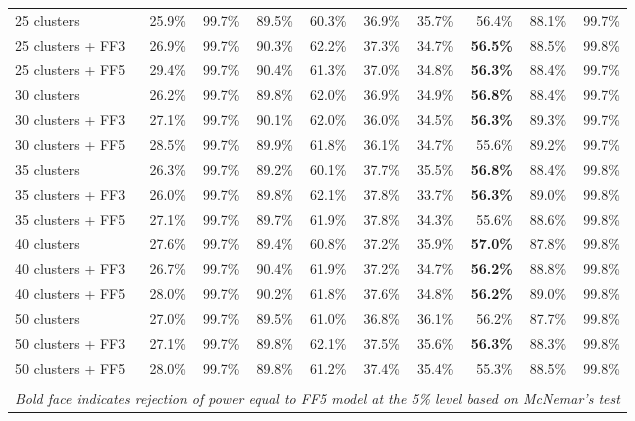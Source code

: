 \begin{table}[!h]
\begin{center}
\begin{tabular}{lrrrrrrrrr}
25 clusters	& 25.9\% & 99.7\% & 89.5\% & 60.3\% & 36.9\% & 35.7\% & 56.4\% & 88.1\% & 99.7\% \\
25 clusters + FF3	& 26.9\% & 99.7\% & 90.3\% & 62.2\% & 37.3\% & 34.7\% & \textbf{56.5\%} & 88.5\% & 99.8\% \\
25 clusters + FF5	& 29.4\% & 99.7\% & 90.4\% & 61.3\% & 37.0\% & 34.8\% & \textbf{56.3\%} & 88.4\% & 99.7\% \\
30 clusters	& 26.2\% & 99.7\% & 89.8\% & 62.0\% & 36.9\% & 34.9\% & \textbf{56.8\%} & 88.4\% & 99.7\% \\
30 clusters + FF3	& 27.1\% & 99.7\% & 90.1\% & 62.0\% & 36.0\% & 34.5\% & \textbf{56.3\%} & 89.3\% & 99.7\% \\
30 clusters + FF5	& 28.5\% & 99.7\% & 89.9\% & 61.8\% & 36.1\% & 34.7\% & 55.6\% & 89.2\% & 99.7\% \\
35 clusters	& 26.3\% & 99.7\% & 89.2\% & 60.1\% & 37.7\% & 35.5\% & \textbf{56.8\%} & 88.4\% & 99.8\% \\
35 clusters + FF3	& 26.0\% & 99.7\% & 89.8\% & 62.1\% & 37.8\% & 33.7\% & \textbf{56.3\%} & 89.0\% & 99.8\% \\
35 clusters + FF5	& 27.1\% & 99.7\% & 89.7\% & 61.9\% & 37.8\% & 34.3\% & 55.6\% & 88.6\% & 99.8\% \\
40 clusters	& 27.6\% & 99.7\% & 89.4\% & 60.8\% & 37.2\% & 35.9\% & \textbf{57.0\%} & 87.8\% & 99.8\% \\
40 clusters + FF3	& 26.7\% & 99.7\% & 90.4\% & 61.9\% & 37.2\% & 34.7\% & \textbf{56.2\%} & 88.8\% & 99.8\% \\
40 clusters + FF5	& 28.0\% & 99.7\% & 90.2\% & 61.8\% & 37.6\% & 34.8\% & \textbf{56.2\%} & 89.0\% & 99.8\% \\
50 clusters	& 27.0\% & 99.7\% & 89.5\% & 61.0\% & 36.8\% & 36.1\% & 56.2\% & 87.7\% & 99.8\% \\
50 clusters + FF3	& 27.1\% & 99.7\% & 89.8\% & 62.1\% & 37.5\% & 35.6\% & \textbf{56.3\%} & 88.3\% & 99.8\% \\
50 clusters + FF5	& 28.0\% & 99.7\% & 89.8\% & 61.2\% & 37.4\% & 35.4\% & 55.3\% & 88.5\% & 99.8\% \\
\hline\\
\multicolumn{10}{l}{\itshape Bold face indicates rejection of power equal to FF5 model at the 5\% level based on McNemar's test}
    \end{tabular}
    \end{center}
\end{table}
